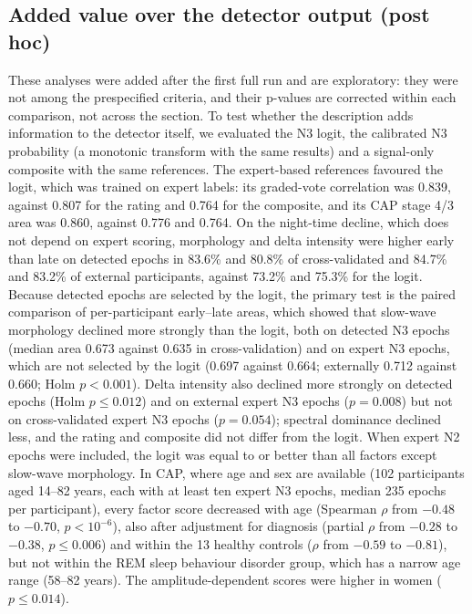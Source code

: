 \subsection{Added value over the detector output (post hoc)}
These analyses were added after the first full run and are exploratory: they were not among the prespecified criteria, and their p-values are corrected within each comparison, not across the section. To test whether the description adds information to the detector itself, we evaluated the N3 logit, the calibrated N3 probability (a monotonic transform with the same results) and a signal-only composite with the same references. The expert-based references favoured the logit, which was trained on expert labels: its graded-vote correlation was 0.839, against 0.807 for the rating and 0.764 for the composite, and its CAP stage 4/3 area was 0.860, against 0.776 and 0.764. On the night-time decline, which does not depend on expert scoring, morphology and delta intensity were higher early than late on detected epochs in 83.6\% and 80.8\% of cross-validated and 84.7\% and 83.2\% of external participants, against 73.2\% and 75.3\% for the logit. Because detected epochs are selected by the logit, the primary test is the paired comparison of per-participant early--late areas, which showed that slow-wave morphology declined more strongly than the logit, both on detected N3 epochs (median area 0.673 against 0.635 in cross-validation) and on expert N3 epochs, which are not selected by the logit (0.697 against 0.664; externally 0.712 against 0.660; Holm $p < 0.001$). Delta intensity also declined more strongly on detected epochs (Holm $p \le 0.012$) and on external expert N3 epochs ($p = 0.008$) but not on cross-validated expert N3 epochs ($p = 0.054$); spectral dominance declined less, and the rating and composite did not differ from the logit. When expert N2 epochs were included, the logit was equal to or better than all factors except slow-wave morphology. In CAP, where age and sex are available (102 participants aged 14--82 years, each with at least ten expert N3 epochs, median 235 epochs per participant), every factor score decreased with age (Spearman $\rho$ from $-0.48$ to $-0.70$, $p < 10^{-6}$), also after adjustment for diagnosis (partial $\rho$ from $-0.28$ to $-0.38$, $p \le 0.006$) and within the 13 healthy controls ($\rho$ from $-0.59$ to $-0.81$), but not within the REM sleep behaviour disorder group, which has a narrow age range (58--82 years). The amplitude-dependent scores were higher in women ($p \le 0.014$). %

